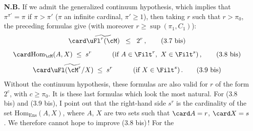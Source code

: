 \textbf{N.B.} If we admit the generalized continuum hypothesis, which implies that $\pi^{\pi'}=\pi$ if $\pi>\pi'$ ($\pi$ an infinite cardinal, $\pi'\geq1$), then taking $r$ such that $r>\pi_0$, the preceding formulas give (with moreover $r\geq\sup(\pi_1,C_1)$):
\[
\card\widetilde{\uFl^r(\cM)} \;\;\leq\;\; 2^r\,,
\tag*{(3.7 bis)}
\]
\[
\card\mathrm{Hom}_{\cM}(A,X) \;\leq\; s^r \qquad\quad (\text{if } A\in\Filt^r,\ X\in\Filt^s)\,,
\tag*{(3.8 bis)}
\]
\[
\card\widetilde{\uFl(\cM^r/X)} \;\leq\; s^r \qquad\quad (\text{if } X\in\Filt^s)\,.
\tag*{(3.9 bis)}
\]
Without the continuum hypothesis, these formulas are also valid for $r$ of the form $2^c$, with $c\geq\pi_0$. It is these last formulas which look the most natural. For (3.8 bis) and %
(3.9 bis), I point out that the right-hand side $s^r$ is the cardinality of the set $\mathrm{Hom}_{\mathrm{Ens}}(A,X)$, where $A$, $X$ are two sets such that $\card A=r$, $\card X=s$. We therefore cannot hope to improve (3.8 bis)\,! For the